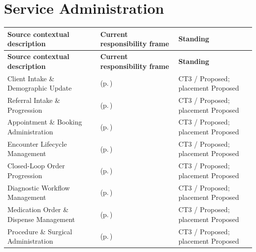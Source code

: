 \section{Service Administration}
\begingroup\small\setlength{\TableWidth}{\dimexpr\linewidth-6\tabcolsep-4\arrayrulewidth\relax}
\begin{longtable}{|>{\raggedright\arraybackslash}p{0.37\TableWidth}|>{\raggedright\arraybackslash}p{0.4\TableWidth}|>{\raggedright\arraybackslash}p{0.23\TableWidth}|}
\hline\rowcolor{TableHead}\textbf{Source contextual description} & \textbf{Current responsibility frame} & \textbf{Standing}\\\hline\endfirsthead
\hline\rowcolor{TableHead}\textbf{Source contextual description} & \textbf{Current responsibility frame} & \textbf{Standing}\\\hline\endhead
\hline\endfoot
Client Intake \& Demographic Update & \nameref{cap:bec-reviewed-client-intake-demographic-update} (p.\,\pageref{cap:bec-reviewed-client-intake-demographic-update}) & CT3 / Proposed; placement Proposed\\\hline
Referral Intake \& Progression & \nameref{cap:bec-reviewed-referral-intake-progression} (p.\,\pageref{cap:bec-reviewed-referral-intake-progression}) & CT3 / Proposed; placement Proposed\\\hline
Appointment \& Booking Administration & \nameref{cap:bec-reviewed-appointment-booking-administration} (p.\,\pageref{cap:bec-reviewed-appointment-booking-administration}) & CT3 / Proposed; placement Proposed\\\hline
Encounter Lifecycle Management & \nameref{cap:bec-reviewed-encounter-lifecycle-management} (p.\,\pageref{cap:bec-reviewed-encounter-lifecycle-management}) & CT3 / Proposed; placement Proposed\\\hline
Closed-Loop Order Progression & \nameref{cap:bec-reviewed-closed-loop-order-progression} (p.\,\pageref{cap:bec-reviewed-closed-loop-order-progression}) & CT3 / Proposed; placement Proposed\\\hline
Diagnostic Workflow Management & \nameref{cap:bec-reviewed-diagnostic-workflow-management} (p.\,\pageref{cap:bec-reviewed-diagnostic-workflow-management}) & CT3 / Proposed; placement Proposed\\\hline
Medication Order \& Dispense Management & \nameref{cap:bec-reviewed-medication-order-dispense-management} (p.\,\pageref{cap:bec-reviewed-medication-order-dispense-management}) & CT3 / Proposed; placement Proposed\\\hline
Procedure \& Surgical Administration & \nameref{cap:bec-reviewed-procedure-surgical-administration} (p.\,\pageref{cap:bec-reviewed-procedure-surgical-administration}) & CT3 / Proposed; placement Proposed\\\hline

\end{longtable}

